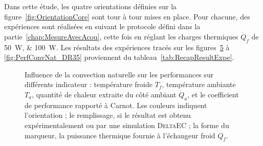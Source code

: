 Dans cette étude, les quatre orientations définies sur la figure~\ref{fig:OrientationCore} sont tour à tour mises en place. Pour chacune, des expériences sont réalisées en suivant le protocole défini dans la partie~\ref{chap:MesureAvecAcou}, cette fois en réglant les charges thermiques $\dot Q_f$ de \qtylist{50;100}{\watt}. Les résultats des expériences tracés sur les figures~\ref{fig:PerfConvNat} à \ref{fig:PerfConvNat_DR35} proviennent du tableau~\ref{tab:RecapResultExpe}.\medskip


\begin{figure}[!ht]
    \centering
	\begin{subfigure}{.48\textwidth}
		\centering
        
		\caption{}
		\label{fig:PerfConvNat_Tf}
	\end{subfigure}%
	\begin{subfigure}{.48\textwidth}
		\centering
        
		\caption{}
		\label{fig:PerfConvNat_Ta}
	\end{subfigure}
	
	\vspace{1cm}
	
	\begin{subfigure}{.48\textwidth}
		\centering
        
		\caption{}
		\label{fig:PerfConvNat_Qa}
	\end{subfigure}%
	\begin{subfigure}{.48\textwidth}
		\centering
        
		\caption{}
		\label{fig:PerfConvNat_COP}
	\end{subfigure}	     
    \caption{Influence de la convection naturelle sur les performances sur différents indicateur :  température froide $T_f$,  température ambiante~$T_a$,  quantité de chaleur extraite du côté ambiant $\dot Q_a$, et  le coefficient de performance rapporté à Carnot. Les couleurs indiquent l'orientation ; le remplissage, si le résultat est obtenu expérimentalement ou par une simulation \textsc{DeltaEC} ; la forme du marqueur, la puissance thermique fournie à l'échangeur froid $Q_f$.}
    \label{fig:PerfConvNat}
\end{figure}

